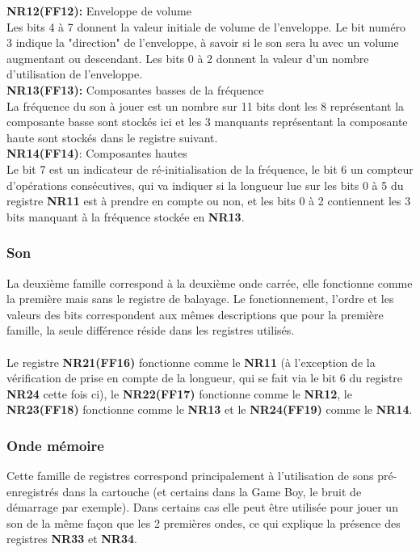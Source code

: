\documentclass{report}
\begin{document}
	\textbf{NR12(FF12):} Enveloppe de volume \\
		Les bits 4 à 7 donnent la valeur initiale de volume de
		l'enveloppe.
		Le bit numéro 3 indique la "direction" de l'enveloppe,
		à savoir si le son sera lu avec un volume augmentant
		ou descendant.
		Les bits 0 à 2 donnent la valeur d'un nombre
		d'utilisation de l'enveloppe.\\ 
	
	\textbf{NR13(FF13):} Composantes basses de la fréquence \\
		La fréquence du son à jouer est un nombre sur 11 bits
		dont les 8 représentant la composante basse sont
		stockés ici et les 3 manquants représentant la
		composante haute sont stockés dans le registre
		suivant.\\ 

	\textbf{NR14(FF14)}: Composantes hautes \\
		Le bit 7 est un indicateur de ré-initialisation de la
		fréquence, le bit 6 un compteur d'opérations
		consécutives, qui va indiquer si la longueur lue sur
		les bits 0 à 5 du registre \textbf{NR11} est à prendre en
		compte ou non, et les bits 0 à 2 contiennent les 3 bits
		manquant à la fréquence stockée en \textbf{NR13}.
	\subsubsection{Son}
		La deuxième famille correspond à la deuxième onde carrée, elle
		fonctionne comme la première mais sans le registre de
		balayage. Le fonctionnement, l'ordre et les valeurs des bits
		correspondent aux mêmes descriptions que pour la première
		famille, la seule différence réside dans les registres
		utilisés.\\ \\
	
	Le registre \textbf{NR21(FF16)} fonctionne comme le \textbf{NR11} (à
		l'exception de la vérification de prise en compte de
		la longueur, qui se fait via le bit 6 du registre \textbf{NR24}
		cette fois ci), le \textbf{NR22(FF17)} fonctionne comme le
		\textbf{NR12}, le \textbf{NR23(FF18)} fonctionne comme le \textbf{NR13} et le
		\textbf{NR24(FF19)} comme le \textbf{NR14}. 
			
	\subsubsection{Onde mémoire}
		Cette famille de registres correspond principalement à
		l'utilisation de sons pré-enregistrés dans la cartouche
		(et certains dans la Game Boy, le bruit de démarrage par
		exemple).
		Dans certains cas elle peut être utilisée pour jouer un son de
		la même façon que les 2 premières ondes, ce qui explique la
		présence des registres \textbf{NR33} et \textbf{NR34}. \\ 
		
\end{document}

